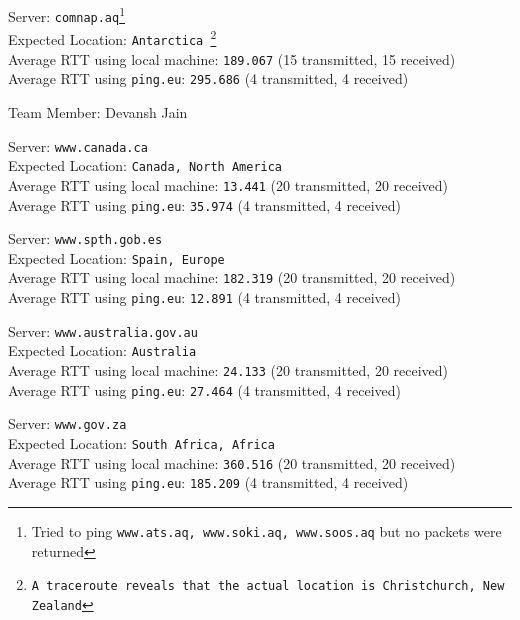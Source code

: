 \documentclass[11pt, fleqn]{article}
\begin{document}
\hrulefill
\smallskip

Server: \texttt{comnap.aq}\footnote{Tried to ping \texttt{www.ats.aq, www.soki.aq, www.soos.aq} but no packets were returned}\\
Expected Location: \texttt{Antarctica \footnote{A \texttt{traceroute} reveals that the actual location is Christchurch, New Zealand}}\\
Average RTT using local machine: \texttt{189.067} (15 transmitted, 15 received)\\
Average RTT using \texttt{ping.eu}: \texttt{295.686} (4 transmitted, 4 received)



\newpage


Team Member: Devansh Jain

\hrulefill
\smallskip

Server: \texttt{www.canada.ca} \\
Expected Location: \texttt{Canada, North America}\\
Average RTT using local machine: \texttt{13.441} (20 transmitted, 20 received)\\
Average RTT using \texttt{ping.eu}: \texttt{35.974} (4 transmitted, 4 received)

\hrulefill
\smallskip

Server: \texttt{www.spth.gob.es}\\
Expected Location: \texttt{Spain, Europe}\\
Average RTT using local machine: \texttt{182.319} (20 transmitted, 20 received)\\
Average RTT using \texttt{ping.eu}: \texttt{12.891} (4 transmitted, 4 received)

\hrulefill
\smallskip

Server: \texttt{www.australia.gov.au}\\
Expected Location: \texttt{Australia}\\
Average RTT using local machine: \texttt{24.133} (20 transmitted, 20 received)\\
Average RTT using \texttt{ping.eu}: \texttt{27.464} (4 transmitted, 4 received)

\hrulefill
\smallskip

Server: \texttt{www.gov.za}\\
Expected Location: \texttt{South Africa, Africa}\\
Average RTT using local machine: \texttt{360.516} (20 transmitted, 20 received)\\
Average RTT using \texttt{ping.eu}: \texttt{185.209} (4 transmitted, 4 received)
\end{document}
